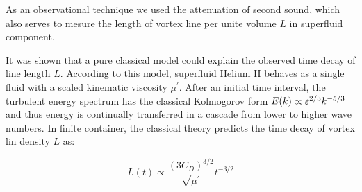 As an observational technique we used the attenuation of second sound, which also serves to mesure the length of vortex line per unite volume $L$ in superfluid component.

It was shown that a pure classical model could explain the observed time decay of line length $L$. According to this model, superfluid Helium II behaves as a single fluid with a scaled
kinematic viscosity $\mu^{\prime}$. After an initial time interval, the turbulent energy spectrum has the classical Kolmogorov form $E(k) \propto \varepsilon^{2/3} k^{-5/3}$ and thus energy is continually transferred in a cascade from lower to higher wave numbers. In finite container, the
classical theory predicts the time decay of vortex lin density $L$ as:

\begin{equation}
L(t) \propto \frac{(3C_D)^{3/2}}{\sqrt{\mu^{\prime}}} t^{-3/2}
\end{equation}

\newpage
